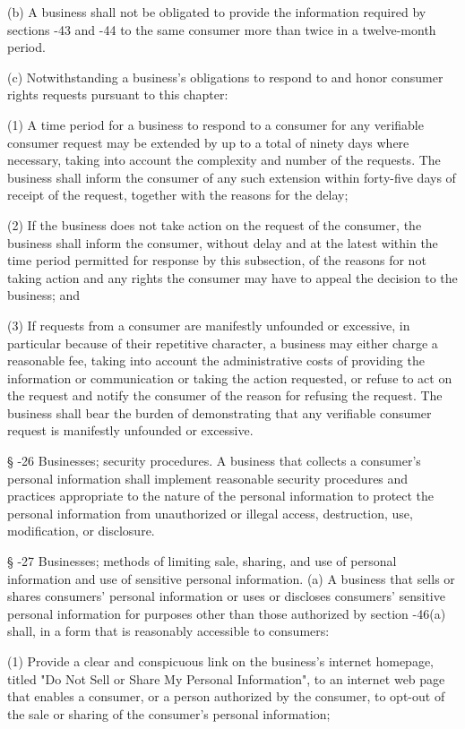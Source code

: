      (b)  A business shall not be obligated to provide the information required by sections    -43 and    -44 to the same consumer more than twice in a twelve-month period.

     (c)  Notwithstanding a business's obligations to respond to and honor consumer rights requests pursuant to this chapter:

     (1)  A time period for a business to respond to a consumer for any verifiable consumer request may be extended by up to a total of ninety days where necessary, taking into account the complexity and number of the requests.  The business shall inform the consumer of any such extension within forty-five days of receipt of the request, together with the reasons for the delay;

     (2)  If the business does not take action on the request of the consumer, the business shall inform the consumer, without delay and at the latest within the time period permitted for response by this subsection, of the reasons for not taking action and any rights the consumer may have to appeal the decision to the business; and

     (3)  If requests from a consumer are manifestly unfounded or excessive, in particular because of their repetitive character, a business may either charge a reasonable fee, taking into account the administrative costs of providing the information or communication or taking the action requested, or refuse to act on the request and notify the consumer of the reason for refusing the request.  The business shall bear the burden of demonstrating that any verifiable consumer request is manifestly unfounded or excessive.

     §   -26  Businesses; security procedures.  A business that collects a consumer's personal information shall implement reasonable security procedures and practices appropriate to the nature of the personal information to protect the personal information from unauthorized or illegal access, destruction, use, modification, or disclosure.

     §   -27  Businesses; methods of limiting sale, sharing, and use of personal information and use of sensitive personal information.  (a)  A business that sells or shares consumers' personal information or uses or discloses consumers' sensitive personal information for purposes other than those authorized by section    -46(a) shall, in a form that is reasonably accessible to consumers:

     (1)  Provide a clear and conspicuous link on the business's internet homepage, titled "Do Not Sell or Share My Personal Information", to an internet web page that enables a consumer, or a person authorized by the consumer, to opt-out of the sale or sharing of the consumer's personal information;

